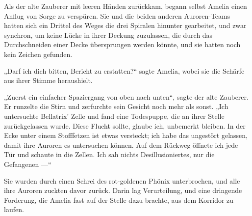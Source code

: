 \later

Als der alte Zauberer mit leeren Händen zurückkam, begann selbst Amelia einen Anflug von Sorge zu verspüren. Sie und die beiden anderen Auroren-Teams hatten sich ein Drittel des Weges die drei Spiralen hinunter gearbeitet, und zwar synchron, um keine Lücke in ihrer Deckung zuzulassen, die durch das Durchschneiden einer Decke übersprungen werden könnte, und sie hatten noch kein Zeichen gefunden.

„Darf ich dich bitten, Bericht zu erstatten?“ sagte Amelia, wobei sie die Schärfe aus ihrer Stimme heraushielt.

„Zuerst ein einfacher Spaziergang von oben nach unten“, sagte der alte Zauberer. Er runzelte die Stirn und zerfurchte sein Gesicht noch mehr als sonst.
„Ich untersuchte Bellatrix’ Zelle und fand eine Todespuppe, die an ihrer Stelle zurückgelassen wurde. Diese Flucht sollte, glaube ich, unbemerkt bleiben. In der Ecke unter einem Stofffetzen ist etwas versteckt; ich habe das ungestört gelassen, damit ihre Auroren es untersuchen können. Auf dem Rückweg öffnete ich jede Tür und schaute in die Zellen. Ich sah nichts Desillusioniertes, nur die Gefangenen —“

Sie wurden durch einen Schrei des rot-goldenen Phönix unterbrochen, und alle ihre Auroren zuckten davor zurück. Darin lag Verurteilung, und eine dringende Forderung, die Amelia fast auf der Stelle dazu brachte, aus dem Korridor zu laufen.


